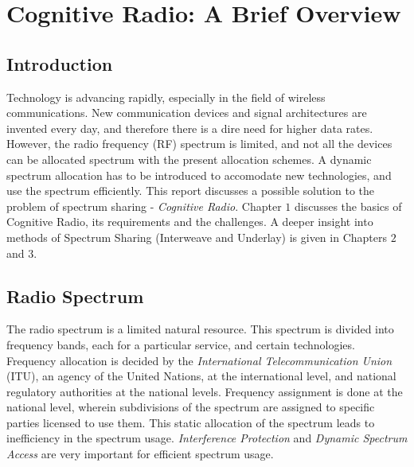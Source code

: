 \chapter{Cognitive Radio: A Brief Overview}

\section{Introduction}

Technology is advancing rapidly, especially
in the field of wireless communications. New communication devices and signal
architectures are invented every day, and therefore there is a dire need for
higher data rates. However, the radio frequency (RF) spectrum is limited, and not all the devices can be
allocated spectrum with the present allocation schemes. A dynamic spectrum
allocation has to be introduced to accomodate new technologies, and use the
spectrum efficiently. This report discusses a possible solution to the problem
of spectrum sharing - \textit{Cognitive Radio}. Chapter $1$ discusses the basics
of Cognitive Radio, its requirements and the challenges. A deeper insight into
methods of Spectrum Sharing (Interweave and Underlay) is given in Chapters $2$
and $3$.

\section{Radio Spectrum}
The radio spectrum is a limited natural resource\cite{haykin}. This spectrum is
divided into frequency bands, each for a particular service, and certain technologies.
Frequency allocation is decided by the \textit{International Telecommunication
Union} (ITU), an agency of the United Nations, at the international level, and
national regulatory authorities at the national levels\cite{doyle}. Frequency assignment
is done at the national level, wherein subdivisions of the spectrum are assigned to
specific parties licensed to use them. This static allocation of the spectrum
leads to inefficiency in the spectrum usage. \textit{Interference Protection}
and \textit{Dynamic Spectrum Access} are very important for efficient spectrum
usage.

